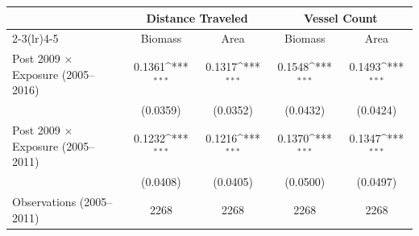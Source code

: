 \def\sym#1{\ifmmode^{#1}\else\(^{#1}\)\fi}
\begin{tabular}{l*{4}{c}}
\hline\hline
 &\multicolumn{2}{c}{Distance Traveled}&\multicolumn{2}{c}{Vessel Count}\\
\cmidrule(lr){2-3}\cmidrule(lr){4-5}
 &\multicolumn{1}{c}{Biomass}&\multicolumn{1}{c}{Area}&\multicolumn{1}{c}{Biomass}&\multicolumn{1}{c}{Area}\\
\hline
Post 2009 $\times$ Exposure (2005--2016) & 0.1361\sym{***} & 0.1317\sym{***} & 0.1548\sym{***} & 0.1493\sym{***}\\
  & (0.0359) & (0.0352) & (0.0432) & (0.0424)\\
[0.4em]
Post 2009 $\times$ Exposure (2005--2011) & 0.1232\sym{***} & 0.1216\sym{***} & 0.1370\sym{***} & 0.1347\sym{***}\\
  & (0.0408) & (0.0405) & (0.0500) & (0.0497)\\
\hline
Observations (2005--2011) & 2268 & 2268 & 2268 & 2268\\
\hline\hline
\end{tabular}